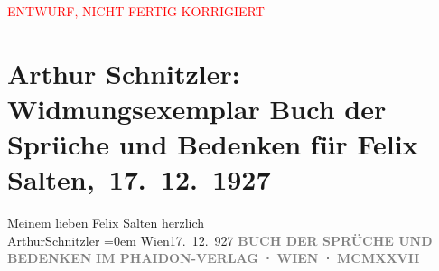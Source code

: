 
\begin{center}
            \textcolor{red}{ENTWURF, NICHT FERTIG KORRIGIERT}
                      \end{center}
            
         
         \renewcommand{\erwaehntePersonen}{Personen: Felix Salten}
         \renewcommand{\erwaehnteInstitutionen}{Institutionen: Phaidon-Verlag}
         \renewcommand{\erwaehnteOrte}{Orte: Wien}
         \renewcommand{\erwaehnteWerke}{Werke: Buch der Sprüche und Bedenken}
               \section[ Arthur Schnitzler: Widmungsexemplar Buch der Sprüche und Bedenken für Felix Salten, 17. 12. 1927]{ Arthur Schnitzler: Widmungsexemplar Buch der Sprüche und Bedenken für
               Felix Salten, 17. 12. 1927}\nopagebreak{}\rehead{ }\begin{ledgroupsized}[t]{13cm}\normalsize\beginnumbering{} \toendnotes[C]{\smallbreak\pagebreak[2]} 
\pstart
           \noindent{}{\pb}Meinem lieben Felix Salten\pend
           \pstart
           herzlich {\\[\baselineskip]}\spacefill\mbox{ArthurSchnitzler}\pend
           \leftskip=0em{}\pstart
           Wien17. 12. 927\pend
           {\bigskip}\pstart
           \noindent{}\centering{}{\pb}\textcolor{gray}{\textbf{}}\pend
           \pstart
           \noindent{}\centering{}\textcolor{gray}{\textbf{BUCH DER SPRÜCHE UND BEDENKEN}}\pend
           \pstart
           \noindent{}\centering{}\textcolor{gray}{\textbf{}}\pend
           {\bigskip}\pstart
           \noindent{}\centering{}\textcolor{gray}{\textbf{IM PHAIDON-VERLAG ⋅ WIEN ⋅ MCMXXVII}}\pend
           
         
         \endnumbering{}\end{ledgroupsized}  \newcommand{\dateiname}{L03610}\newcommand{\titel}{Arthur Schnitzler: Widmungsexemplar Buch der Sprüche und Bedenken für Felix Salten, 17. 12. 1927}\newcommand{\editorInnen}{Martin Anton Müller und Laura Untner}
      